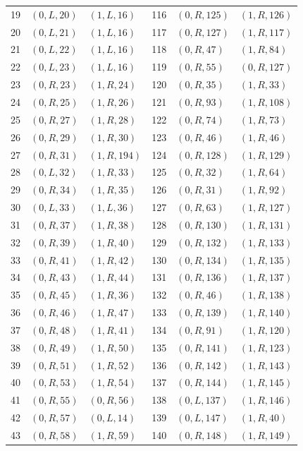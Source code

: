 \begin{longtable}{r@{\quad}ll@{\qquad}r@{\quad}ll}
19 & $(0,L,20)$ & $(1,L,16)$ & 116 & $(0,R,125)$ & $(1,R,126)$\\
20 & $(0,L,21)$ & $(1,L,16)$ & 117 & $(0,R,127)$ & $(1,R,117)$\\
21 & $(0,L,22)$ & $(1,L,16)$ & 118 & $(0,R,47)$ & $(1,R,84)$\\
22 & $(0,L,23)$ & $(1,L,16)$ & 119 & $(0,R,55)$ & $(0,R,127)$\\
23 & $(0,R,23)$ & $(1,R,24)$ & 120 & $(0,R,35)$ & $(1,R,33)$\\
24 & $(0,R,25)$ & $(1,R,26)$ & 121 & $(0,R,93)$ & $(1,R,108)$\\
25 & $(0,R,27)$ & $(1,R,28)$ & 122 & $(0,R,74)$ & $(1,R,73)$\\
26 & $(0,R,29)$ & $(1,R,30)$ & 123 & $(0,R,46)$ & $(1,R,46)$\\
27 & $(0,R,31)$ & $(1,R,194)$ & 124 & $(0,R,128)$ & $(1,R,129)$\\
28 & $(0,L,32)$ & $(1,R,33)$ & 125 & $(0,R,32)$ & $(1,R,64)$\\
29 & $(0,R,34)$ & $(1,R,35)$ & 126 & $(0,R,31)$ & $(1,R,92)$\\
30 & $(0,L,33)$ & $(1,L,36)$ & 127 & $(0,R,63)$ & $(1,R,127)$\\
31 & $(0,R,37)$ & $(1,R,38)$ & 128 & $(0,R,130)$ & $(1,R,131)$\\
32 & $(0,R,39)$ & $(1,R,40)$ & 129 & $(0,R,132)$ & $(1,R,133)$\\
33 & $(0,R,41)$ & $(1,R,42)$ & 130 & $(0,R,134)$ & $(1,R,135)$\\
34 & $(0,R,43)$ & $(1,R,44)$ & 131 & $(0,R,136)$ & $(1,R,137)$\\
35 & $(0,R,45)$ & $(1,R,36)$ & 132 & $(0,R,46)$ & $(1,R,138)$\\
36 & $(0,R,46)$ & $(1,R,47)$ & 133 & $(0,R,139)$ & $(1,R,140)$\\
37 & $(0,R,48)$ & $(1,R,41)$ & 134 & $(0,R,91)$ & $(1,R,120)$\\
38 & $(0,R,49)$ & $(1,R,50)$ & 135 & $(0,R,141)$ & $(1,R,123)$\\
39 & $(0,R,51)$ & $(1,R,52)$ & 136 & $(0,R,142)$ & $(1,R,143)$\\
40 & $(0,R,53)$ & $(1,R,54)$ & 137 & $(0,R,144)$ & $(1,R,145)$\\
41 & $(0,R,55)$ & $(0,R,56)$ & 138 & $(0,L,137)$ & $(1,R,146)$\\
42 & $(0,R,57)$ & $(0,L,14)$ & 139 & $(0,L,147)$ & $(1,R,40)$\\
43 & $(0,R,58)$ & $(1,R,59)$ & 140 & $(0,R,148)$ & $(1,R,149)$\\

\end{longtable}
